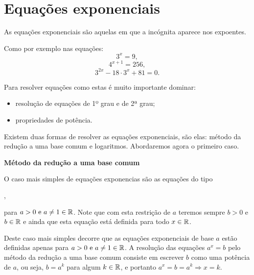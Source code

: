 \newpage
\section{Equações exponenciais}

  \vskip0.3cm
 \colorbox{azul}{
 \begin{minipage}{0.9\linewidth}
 \begin{center}
  As equações exponenciais são aquelas em que a incógnita aparece nos expoentes.
 \end{center}
 \end{minipage}}
 \vskip0.3cm

 Como por exemplo nas equações:
\begin{equation}
3^x= 9 ,
\end{equation}
\begin{equation}
4^{x+1}= 256 ,
\end{equation}
\begin{equation}
3^{2x}- 18\cdot 3^x + 81=0 .
\end{equation}

 Para resolver equações como estas é muito importante dominar:
 \begin{itemize}
  \item resolução de equações de 1º grau e de 2ª grau;
  \item propriedades de potência.
 \end{itemize}

 Existem duas formas de resolver as equações exponenciais, são elas: método da redução a uma base comum e logaritmos. Abordaremos agora o primeiro caso.

 \vskip0.3cm

 \textbf{Método da redução a uma base comum}

 \vskip0.3cm

 O caso mais simples de equações exponencias são as equações do tipo
 
 ,

 para $a > 0 \text{ e } a \neq 1 \in \mathbb{R}$. Note que com esta restrição de $a$ teremos sempre $b > 0$ e $b \in \mathbb{R}$ e ainda que esta equação está definida para todo $x \in \mathbb{R}$.

 Deste caso mais simples decorre que as equações exponenciais de base $a$ estão definidas apenas para $a > 0 \text{ e } a \neq 1 \in \mathbb{R}$. A resolução das equações $a^x= b$ pelo método da redução a uma base comum consiste em escrever $b$ como uma potência de $a$, ou seja, $b= a^k$  para algum $k \in \mathbb{R}$, e portanto $a^{x}= b= a^{k} \Rightarrow x= k$.

